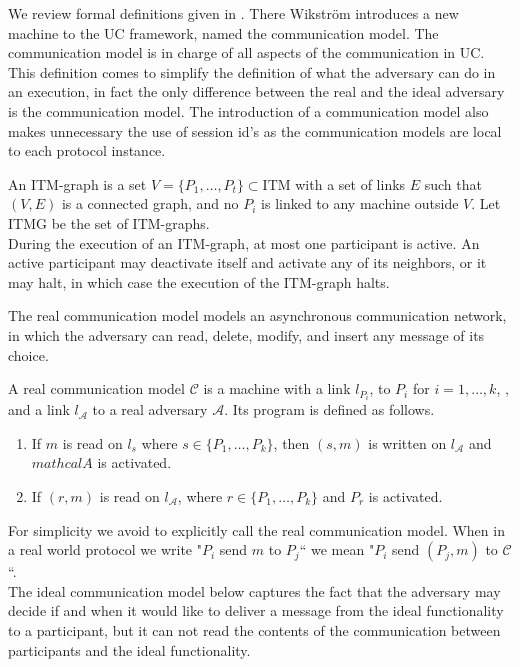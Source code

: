 \documentclass{acm_proc_article-sp}
\begin{document}
We review formal definitions given in \cite{mnCompleto}. There Wikstr\"om introduces
a new machine to the UC framework, named the communication model.
The communication model is in charge of all aspects of the
communication in UC. This definition comes to simplify the definition of what the
adversary can do in an execution, in fact the only difference between the real and the ideal
adversary is the communication model. The introduction of a communication model
also makes unnecessary the use of session id's as the communication models are local to each protocol instance.


\begin{definition}
An ITM-graph is a set $V = \{P_1, \ldots, P_t\} \subset \textrm{ITM}$ with a set of
links $E$ such that $(V, E)$ is a connected graph, and no $P_i$ is linked to any
machine outside $V$. Let ITMG be the set of ITM-graphs.\\
During the execution of an ITM-graph, at most one participant is active. An active
participant may deactivate itself and activate any of its neighbors, or it may halt, in
which case the execution of the ITM-graph halts.
\end{definition}

The real communication model models an asynchronous communication network, in which the
adversary can read, delete, modify, and insert any message of its choice. 

\begin{definition}
A real communication model $\mathcal{C}$ is a machine with a link $l_{P_i}$, to $P_i$
for $i = 1, \ldots, k$, , and a link $l_\mathcal{A}$ to a real adversary $\mathcal{A}$.
Its program is defined as follows.
\begin{enumerate}
  \item If $m$ is read on $l_s$ where $s \in \{P_1, \ldots, P_k\}$, then $(s, m)$ is
        written on $l_\mathcal{A}$ and $mathcal{A}$ is activated.
  \item If $(r, m)$ is read on $l_\mathcal{A}$, where $r \in \{P_1, \ldots, P_k\}$
        and $P_r$ is activated.
\end{enumerate}
\end{definition}

For simplicity
we avoid to explicitly call the real communication model. When in a real world
protocol we write "$P_i$ send $m$ to $P_j$`` we mean "$P_i$ send $(P_j,m)$ to
$\mathcal{C}$``.\\
The ideal communication model below captures the fact that the adversary may decide if
and when it would like to deliver a message from the ideal functionality to a
participant, but it can not read the contents of the communication between participants
and the ideal functionality.
\end{document}
